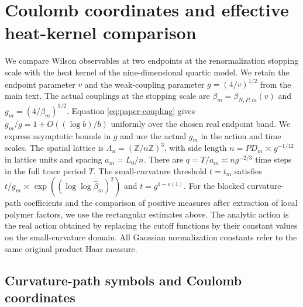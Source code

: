 \documentclass[11pt,a4paper]{article}
\numberwithin{equation}{section}
\begin{document}
\section{Coulomb coordinates and effective heat-kernel comparison}
\label{app:cam-soft}

We compare Wilson observables at two endpoints at the renormalization stopping scale with the heat kernel of the nine-dimensional quartic model. We retain the endpoint parameter \(v\) and the weak-coupling parameter \(g=(4/v)^{1/2}\) from the main text. The actual couplings at the stopping scale are \(\beta_m=\beta_{N,P,m}(v)\) and \(g_m=(4/\beta_m)^{1/2}\). Equation \eqref{eq:paper-coupling} gives \(g_m/g=1+O((\log b)/b)\) uniformly over the chosen real endpoint band. We express asymptotic bounds in \(g\) and use the actual \(g_m\) in the action and time scales. The spatial lattice is \(\Lambda_n=(\mathbb Z/n\mathbb Z)^3\), with side length \(n=PD_m\asymp g^{-1/12}\) in lattice units and spacing \(a_m=L_0/n\). There are \(q=T/a_m\asymp ng^{-2/3}\) time steps in the full trace period \(T\). The small-curvature threshold \(t=t_m\) satisfies \(t/g_m\asymp \exp((\log\log \widehat\beta_m)^2)\) and \(t=g^{1-o(1)}\). For the blocked curvature-path coefficients and the comparison of positive measures after extraction of local polymer factors, we use the rectangular estimates above. The analytic action is the real action obtained by replacing the cutoff functions by their constant values on the small-curvature domain. All Gaussian normalization constants refer to the same original product Haar measure.

\subsection{Curvature-path symbols and Coulomb coordinates}
\end{document}
